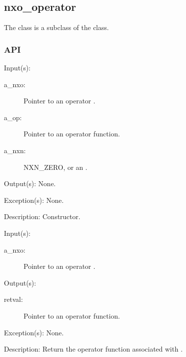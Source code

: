 %
%
%
%
%              

\subsection{nxo\_operator}
\label{nxo_operator}

The  class is a subclass of the  class.

\subsubsection{API}
\begin{capi}
\label{nxo_operator_new}
	\begin{capilist}
	\item[Input(s): ]
		\begin{description}\item[]
		\item[a\_nxo: ]
			Pointer to an operator .
		\item[a\_op: ]
			Pointer to an operator function.
		\item[a\_nxn: ]
			NXN\_ZERO, or an .
		\end{description}
	\item[Output(s): ] None.
	\item[Exception(s): ] None.
	\item[Description: ]
		Constructor.
	\end{capilist}
\label{nxo_operator_f}
	\begin{capilist}
	\item[Input(s): ]
		\begin{description}\item[]
		\item[a\_nxo: ]
			Pointer to an operator \classname{nxo}.
		\end{description}
	\item[Output(s): ]
		\begin{description}\item[]
		\item[retval: ]
			Pointer to an operator function.
		\end{description}
	\item[Exception(s): ] None.
	\item[Description: ]
		Return the operator function associated with \cvar{a\_nxo}.
	\end{capilist}
\end{capi}
